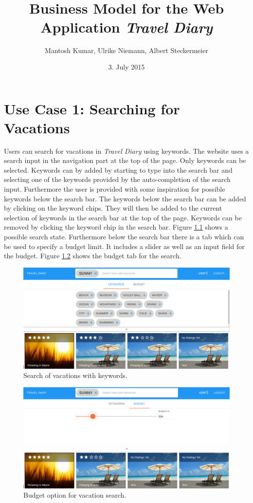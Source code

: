 \documentclass[IN,english]{tumbook}
\title{Business Model for the Web Application \emph{Travel Diary}}
\author{Mantosh Kumar, Ulrike Niemann, Albert Steckermeier}
\date{3. July 2015}
\begin{document}
\maketitle
\newpage
\tableofcontents
\newpage

\chapter{Use Case 1: Searching for Vacations}

Users can search for vacations in \emph{Travel Diary} using keywords. The website uses a search input in the navigation part at the top of the page. Only keywords can be selected. Keywords can by added by starting to type into the search bar and selecting one of the keywords provided by the auto-completion of the search input. Furthermore the user is provided with some inspiration for possible keywords below the search bar. The keywords below the search bar can be added by clicking on the keyword chips. They will then be added to the current selection of keywords in the search bar at the top of the page. Keywords can be removed by clicking the keyword chip in the search bar. Figure \ref{fig:search-keywords} shows a possible search state. Furthermore below the search bar there is a tab which can be used to specify a budget limit. It includes a slider as well as an input field for the budget. Figure \ref{fig:search-budget} shows the budget tab for the search.

\begin{figure}
	\includegraphics[width=\textwidth]{pictures/vacation-search-keywords}
	\caption{Search of vacations with keywords.}
	\label{fig:search-keywords}
\end{figure}

\begin{figure}
	\includegraphics[width=\textwidth]{pictures/vacation-search-budget}	
	\caption{Budget option for vacation search.}
	\label{fig:search-budget}
\end{figure}
\end{document}

